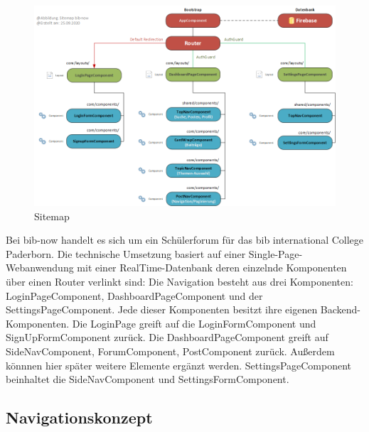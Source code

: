 \documentclass[12pt,titlepage]{article}
\begin{document}
\vspace{2cm}

\begin{figure}[hbt!]
 \centering
 \includegraphics[width=400pt]{abbildungen/Abbildung_Sitemap.png}
 \caption{Sitemap}
\end{figure}


\vspace{2cm}

Bei bib-now handelt es sich um ein Schülerforum für das bib international College Paderborn. Die technische Umsetzung basiert auf  einer Single-Page-Webanwendung mit einer RealTime-Datenbank deren einzelnde Komponenten über einen Router verlinkt sind: Die Navigation besteht aus drei Komponenten: LoginPageComponent, DashboardPageComponent und der SettingsPageComponent. Jede dieser Komponenten besitzt ihre eigenen Backend-Komponenten. Die LoginPage greift auf die LoginFormComponent und SignUpFormComponent zurück. Die DashboardPageComponent greift auf  SideNavComponent, ForumComponent, PostComponent zurück. Außerdem könnnen hier später weitere Elemente ergänzt werden. SettingsPageComponent beinhaltet die SideNavComponent und SettingsFormComponent. 


\FloatBarrier

\subsection{Navigationskonzept}

\vspace{2cm}
\end{document}

